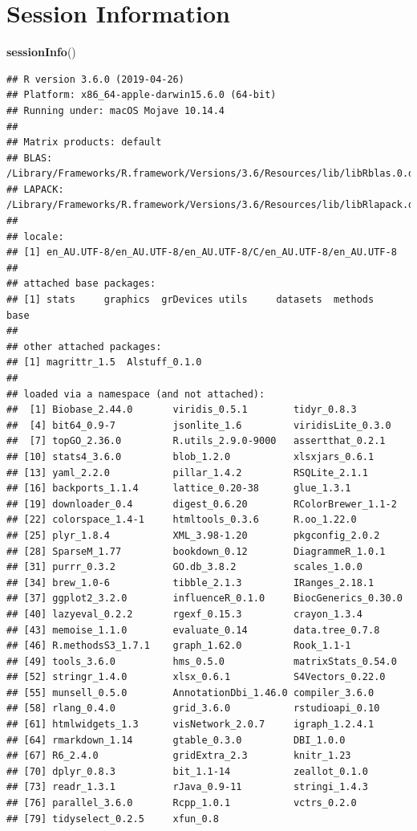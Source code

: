 \documentclass[]{book}
\newenvironment{Shaded}{\begin{snugshade}}{\end{snugshade}}
\newcommand{\KeywordTok}[1]{\textcolor[rgb]{0.13,0.29,0.53}{\textbf{#1}}}
\newcommand{\NormalTok}[1]{#1}
\begin{document}
\hypertarget{session-information}{%
\chapter{Session Information}\label{session-information}}

\begin{Shaded}
\begin{Highlighting}[]
\KeywordTok{sessionInfo}\NormalTok{()}
\end{Highlighting}
\end{Shaded}

\begin{verbatim}
## R version 3.6.0 (2019-04-26)
## Platform: x86_64-apple-darwin15.6.0 (64-bit)
## Running under: macOS Mojave 10.14.4
## 
## Matrix products: default
## BLAS:   /Library/Frameworks/R.framework/Versions/3.6/Resources/lib/libRblas.0.dylib
## LAPACK: /Library/Frameworks/R.framework/Versions/3.6/Resources/lib/libRlapack.dylib
## 
## locale:
## [1] en_AU.UTF-8/en_AU.UTF-8/en_AU.UTF-8/C/en_AU.UTF-8/en_AU.UTF-8
## 
## attached base packages:
## [1] stats     graphics  grDevices utils     datasets  methods   base     
## 
## other attached packages:
## [1] magrittr_1.5  Alstuff_0.1.0
## 
## loaded via a namespace (and not attached):
##  [1] Biobase_2.44.0       viridis_0.5.1        tidyr_0.8.3         
##  [4] bit64_0.9-7          jsonlite_1.6         viridisLite_0.3.0   
##  [7] topGO_2.36.0         R.utils_2.9.0-9000   assertthat_0.2.1    
## [10] stats4_3.6.0         blob_1.2.0           xlsxjars_0.6.1      
## [13] yaml_2.2.0           pillar_1.4.2         RSQLite_2.1.1       
## [16] backports_1.1.4      lattice_0.20-38      glue_1.3.1          
## [19] downloader_0.4       digest_0.6.20        RColorBrewer_1.1-2  
## [22] colorspace_1.4-1     htmltools_0.3.6      R.oo_1.22.0         
## [25] plyr_1.8.4           XML_3.98-1.20        pkgconfig_2.0.2     
## [28] SparseM_1.77         bookdown_0.12        DiagrammeR_1.0.1    
## [31] purrr_0.3.2          GO.db_3.8.2          scales_1.0.0        
## [34] brew_1.0-6           tibble_2.1.3         IRanges_2.18.1      
## [37] ggplot2_3.2.0        influenceR_0.1.0     BiocGenerics_0.30.0 
## [40] lazyeval_0.2.2       rgexf_0.15.3         crayon_1.3.4        
## [43] memoise_1.1.0        evaluate_0.14        data.tree_0.7.8     
## [46] R.methodsS3_1.7.1    graph_1.62.0         Rook_1.1-1          
## [49] tools_3.6.0          hms_0.5.0            matrixStats_0.54.0  
## [52] stringr_1.4.0        xlsx_0.6.1           S4Vectors_0.22.0    
## [55] munsell_0.5.0        AnnotationDbi_1.46.0 compiler_3.6.0      
## [58] rlang_0.4.0          grid_3.6.0           rstudioapi_0.10     
## [61] htmlwidgets_1.3      visNetwork_2.0.7     igraph_1.2.4.1      
## [64] rmarkdown_1.14       gtable_0.3.0         DBI_1.0.0           
## [67] R6_2.4.0             gridExtra_2.3        knitr_1.23          
## [70] dplyr_0.8.3          bit_1.1-14           zeallot_0.1.0       
## [73] readr_1.3.1          rJava_0.9-11         stringi_1.4.3       
## [76] parallel_3.6.0       Rcpp_1.0.1           vctrs_0.2.0         
## [79] tidyselect_0.2.5     xfun_0.8
\end{verbatim}


\end{document}
